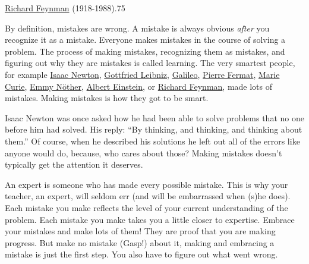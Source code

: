 \lipsum[3]
\begin{Digression-pmt}
{\href{https://mathshistory.st-andrews.ac.uk/Biographies/Feynman/}{Richard Feynman} (1918-1988)}{.75}


  By definition, mistakes are wrong. A mistake is always obvious
  \emph{after} you recognize it as a mistake.  Everyone makes mistakes
  in the course of solving a problem. The process of making mistakes,
  recognizing them as mistakes, and figuring out why they are mistakes
  is called learning.  The very smartest people, for example
  \href{https://mathshistory.st-andrews.ac.uk/Biographies/Newton/}{Isaac
    Newton},
  \href{https://mathshistory.st-andrews.ac.uk/Biographies/Leibniz/}{Gottfried
    Leibniz},
  \href{https://mathshistory.st-andrews.ac.uk/Biographies/Galileo/}{Galileo},
  \href{https://mathshistory.st-andrews.ac.uk/Biographies/Fermat/}{Pierre
    Fermat},
  \href{https://www.smithsonianmag.com/history/madame-curies-passion-74183598/}{Marie
    Curie},
  \href{https://mathshistory.st-andrews.ac.uk/Biographies/Noether_Emmy/}{Emmy
    N\"other},
  \href{https://mathshistory.st-andrews.ac.uk/Biographies/Einstein/}{Albert
    Einstein}, or
  \href{https://mathshistory.st-andrews.ac.uk/Biographies/Feynman/}{Richard
    Feynman}, made lots of mistakes.  Making mistakes is how they got
  to be smart.

  Isaac Newton was once asked how he had been able to solve problems
  that no one before him had solved. His reply: ``By thinking, and
  thinking, and thinking about them.'' Of course, when he described
  his solutions he left out all of the errors like anyone would do,
  because, who cares about those? Making mistakes doesn't typically
  get the attention it deserves.

  An expert is someone who has made every possible mistake. This is
  why your teacher, an expert, will seldom err (and will be
    embarrassed when (s)he does). Each mistake you make reflects the
  level of your current understanding of the problem. Each mistake you
  make takes you a little closer to expertise.  Embrace your mistakes
  and make lots of them!  They are proof that you are making progress.
  But make no mistake (Gasp!) about it, making and embracing a mistake
  is just the first step. You also have to figure out what went wrong.


\end{Digression-pmt}

